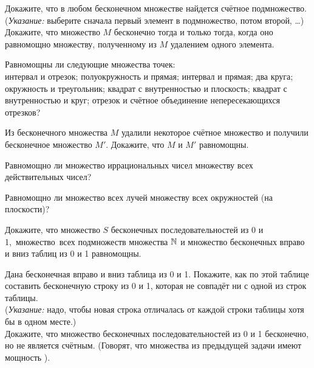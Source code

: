 \documentclass[a4paper,12pt]{article}
\begin{document}


Докажите, что
в любом бесконечном множестве найдется счётное подмножество.\\
{\footnotesize ({\em Указание:} выберите сначала первый элемент в подмножество, потом второй, \dots)}
\\
 Докажите, что множество
$M$ бесконечно тогда и только тогда, когда
оно равномощно множеству, полученному из $M$ удалением
одного элемента.

 Равномощны ли следующие множества точек:\\
 интервал и отрезок;
 полуокружность и прямая;
 интервал и прямая;
 два круга;\\
 окружность и треугольник;
 квадрат с внутренностью %
и плоскость;
 квадрат с внутренностью и круг;
 отрезок и счётное объединение непересекающихся отрезков?


Из бесконечного множества $M$ удалили некоторое счётное множество
и получили бесконечное множество $M'$. Докажите, что $M$ и $M'$ равномощны.


Равномощно ли множество иррациональных чисел множеству
всех действительных чисел?

Равномощно ли множество всех лучей множеству всех
окружностей (на плоскости)?



Докажите, что %
множество $S$ бесконечных последовательностей из 0 и
1,~\hbox{множество~всех} подмножеств множества $\mathbb{N}$
и множество бесконечных вправо и вниз таблиц из 0 и 1 равномощны.



 Дана бесконечная вправо и вниз таблица из 0 и 1.
Покажите, как по этой таблице составить бесконечную строку из 0 и 1,
которая не совпадёт ни с одной из строк таблицы.\\
{\footnotesize ({\em Указание:} надо, чтобы новая строка отличалась
от каждой строки таблицы хотя бы в одном месте.)}\\
Докажите, что
множество бесконечных последовательностей из 0 и 1
 бесконечно, но не является счётным.
(Говорят, что множества из предыдущей задачи
имеют мощность ).
\end{document}
